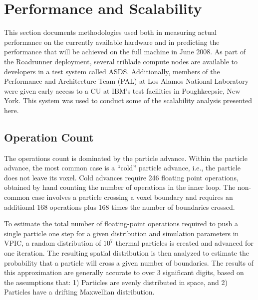 \documentclass[letter,10pt]{article}
\begin{document}
\section{Performance and Scalability} \label{sec:performance}

This section documents methodologies used both in measuring actual
performance on the currently available hardware and in predicting the
performance that will be achieved on the full machine in June
2008.  As part of the Roadrunner deployment, several triblade compute
nodes are available to developers in a test system called ASDS.
Additionally, members of the
Performance and Architecture Team (PAL) at Los Alamos National
Laboratory were given early access to a CU at IBM's test facilities in
Poughkeepsie, New York.  This system was used to conduct some of the
scalability analysis presented here.

\subsection{Operation Count}

The operations count is dominated by the particle advance.  Within the
particle advance, the most common case is a ``cold'' particle advance,
i.e., the particle does not leave its voxel.  Cold 
advances require 246 floating point operations, obtained by hand
counting the number of %
operations in the inner loop.  The non-common case involves a particle
crossing a voxel boundary and requires an additional 168 operations plus 
168 times the number of boundaries crossed.

To estimate the total number of floating-point operations required to
push a single particle one step for a given distribution and
simulation parameters in VPIC, a random distribution of $10^7$ thermal
particles is created and advanced for one iteration.  The resulting
spatial distribution is then analyzed to estimate the probability that
a particle will cross a given number of boundaries.  The results of
this approximation are generally accurate to over 3 significant
digits, based on the assumptions that: 1) Particles are evenly
distributed in space, and 2) Particles have a drifting Maxwellian
distribution.
\end{document}
